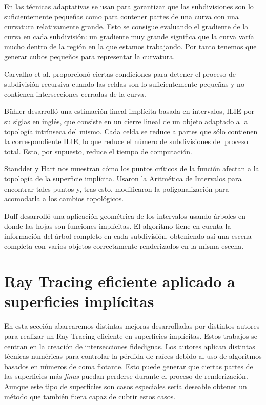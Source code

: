 En \cite{Oliveira00,Suffern03} las técnicas adaptativas se usan para garantizar que las subdivisiones son lo suficientemente pequeñas como para contener partes de una curva con una curvatura relativamente grande. Esto se consigue evaluando el gradiente de la curva en cada subdivisión: un gradiente muy grande significa que la curva varía mucho dentro de la región en la que estamos trabajando. Por tanto tenemos que generar cubos pequeños para representar la curvatura.

Carvalho et al.\cite{Carvalho98} proporcionó ciertas condiciones para detener el proceso de subdivisión recursiva cuando las celdas son lo suficientemente pequeñas y no contienen intersecciones cerradas de la curva.

Bühler\cite{Buhler02} desarrolló una estimación lineal implícita basada en intervalos, ILIE por su siglas en inglés, que consiste en un cierre lineal de un objeto adaptado a la topología intrínseca del mismo. Cada celda se reduce a partes que sólo contienen la correspondiente ILIE, lo que reduce el número de subdivisiones del proceso total. Esto, por supuesto, reduce el tiempo de computación.

Standder y Hart\cite{Stander97} nos muestran cómo los puntos críticos de la función afectan a la topología de la superficie implícita. Usaron la Aritmética de Intervalos para encontrar tales puntos y, tras esto, modificaron la poligonalización para acomodarla a los cambios topológicos.

Duff\cite{Duff92} desarrolló una aplicación geométrica de los intervalos usando árboles en donde las hojas son funciones implícitas. El algoritmo tiene en cuenta la información del árbol completo en cada subdivisión, obteniendo así una escena completa con varios objetos correctamente renderizados en la misma escena.

\section{Ray Tracing eficiente aplicado a superficies implícitas}

En esta sección abarcaremos distintas mejoras desarrolladas por distintos autores para realizar un Ray Tracing eficiente en superficies implícitas. Estos trabajos se centran en la creación de intersecciones fidedignas. Los autores aplican distintas técnicas numéricas para controlar la pérdida de raíces debido al uso de algoritmos basados en números de coma flotante. Esto puede generar que ciertas partes de las superficies más{ \em finas} puedan perderse durante el proceso de renderización. Aunque este tipo de superficies son casos especiales  sería deseable obtener un método que también fuera capaz de cubrir estos casos.

